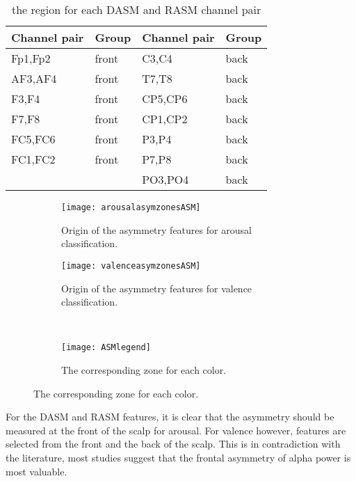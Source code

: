 \begin{table}[H]
\centering
\caption{the region for each DASM and RASM channel pair\label{ASMgroupTable}}
\begin{tabular}{ll|ll}
\textbf{Channel pair} & \textbf{Group} & \textbf{Channel pair} & \textbf{Group} \\ \hline
Fp1,Fp2               & front          & C3,C4                 & back           \\
AF3,AF4               & front          & T7,T8                 & back           \\
F3,F4                 & front          & CP5,CP6               & back           \\
F7,F8                 & front          & CP1,CP2               & back           \\
FC5,FC6               & front          & P3,P4                 & back           \\
FC1,FC2               & front          & P7,P8                 & back           \\
                      &                & PO3,PO4               & back          
\end{tabular}
\end{table}

\begin{figure}[H]
\centering
  \begin{subfigure}[b]{.4\textwidth}
    \texttt{[image: arousalasymzonesASM]}
    \caption{Origin of the asymmetry features for arousal classification.\label{arousalasymzonesASM}}
  \end{subfigure}
\hfill
  \begin{subfigure}[b]{.4\textwidth}
    \texttt{[image: valenceasymzonesASM]}
    \caption{Origin of the asymmetry features for valence classification.\label{valenceasymzonesASM}}
  \end{subfigure}
\\
  \begin{subfigure}[b]{.4\textwidth}
    \texttt{[image: ASMlegend]}
    \caption{The corresponding zone for each color.\label{ASMlegend}}
  \end{subfigure}
\end{figure}

For the DASM and RASM features, it is clear that the asymmetry should be measured at the front of the scalp for arousal. For valence however, features are selected from the front and the back of the scalp. This is in contradiction with the literature, most studies suggest that the frontal asymmetry of alpha power is most valuable.


